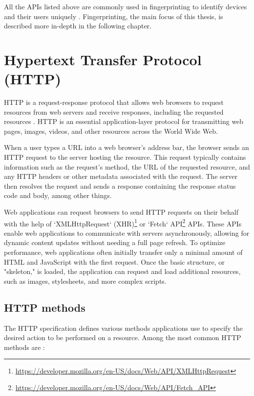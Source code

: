 All the APIs listed above are commonly used in fingerprinting to identify devices and their users uniquely \cite{FingerprintingSurvey}. Fingerprinting, the main focus of this thesis, is described more in-depth in the following chapter.

\section{Hypertext Transfer Protocol (HTTP)}
\label{Section:HTTP}

HTTP is a request-response protocol that allows web browsers to request resources from web servers and receive responses, including the requested resources \cite{MasteringNodeJS}. HTTP is an essential application-layer protocol for transmitting web pages, images, videos, and other resources across the World Wide Web.

When a user types a URL into a web browser's address bar, the browser sends an HTTP request to the server hosting the resource. This request typically contains information such as the request's method, the URL of the requested resource, and any HTTP headers or other metadata associated with the request. The server then resolves the request and sends a response containing the response status code and body, among other things.

Web applications can request browsers to send HTTP requests on their behalf with the help of `XMLHttpRequest` (XHR)\footnote{\url{https://developer.mozilla.org/en-US/docs/Web/API/XMLHttpRequest}} or `Fetch` API\footnote{\url{https://developer.mozilla.org/en-US/docs/Web/API/Fetch_API}} APIs. These APIs enable web applications to communicate with servers asynchronously, allowing for dynamic content updates without needing a full page refresh. To optimize performance, web applications often initially transfer only a minimal amount of HTML and JavaScript with the first request. Once the basic structure, or "skeleton," is loaded, the application can request and load additional resources, such as images, stylesheets, and more complex scripts.

\subsection{HTTP methods}

The HTTP specification \cite{RFC9110} defines various methods applications use to specify the desired action to be performed on a resource. Among the most common HTTP methods are \cite{MDN}:

